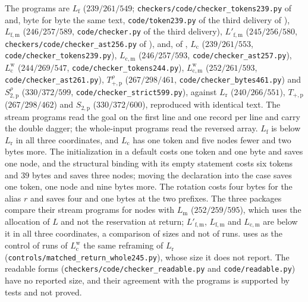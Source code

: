 The programs are $L_{\mathrm f}$ ($239/261/549$;
\texttt{checkers/code/checker\_tokens239.py} of 
and, byte for byte the same text, \texttt{code/token239.py} of the third delivery
of ), $L_{\mathrm{f,m}}$ ($246/257/589$,
\texttt{code/checker.py} of the third delivery), $L'_{\mathrm{f,m}}$
($245/256/580$, \texttt{checkers/code/checker\_ast256.py} of
), and, of ,
$L_{\mathrm c}$ ($239/261/553$, \texttt{code/checker\_tokens239.py}),
$L_{\mathrm{c,m}}$ ($246/257/593$, \texttt{code/checker\_ast257.py}),
$L^{\mathrm w}_{\mathrm c}$ ($244/269/547$, \texttt{code/checker\_tokens244.py}),
$L^{\mathrm w}_{\mathrm{c,m}}$ ($252/261/593$, \texttt{code/checker\_ast261.py}),
$T^{\rho}_{+,\mathrm p}$ ($267/298/461$, \texttt{code/checker\_bytes461.py}) and
$S^{\rho}_{2,\mathrm p}$ ($330/372/599$, \texttt{code/checker\_strict599.py}),
against $L_{\mathrm r}$ ($240/266/551$), $T_{+,\mathrm p}$ ($267/298/462$) and
$S_{2,\mathrm p}$ ($330/372/600$), reproduced with identical text. The stream
programs read the goal on the first line and one record per line and carry the
double dagger; the whole-input programs read the reversed array. $L_{\mathrm f}$ is
below $L_{\mathrm r}$ in all three coordinates, and $L_{\mathrm c}$ has one token
and five nodes fewer and two bytes more. The initialization in a default costs one
token and one byte and saves one node, and the structural binding with its empty
statement costs six tokens and $39$ bytes and saves three nodes; moving the
declaration into the case saves one token, one node and nine bytes more. The
rotation costs four bytes for the alias $r$ and saves four and one bytes at the two
prefixes. The three packages compare their stream programs for nodes with
$L_{\mathrm m}$ ($252/259/595$), which uses the allocation of $L$ and not the
reservation at return; $L'_{\mathrm{f,m}}$, $L_{\mathrm{f,m}}$ and
$L_{\mathrm{c,m}}$ are below it in all three coordinates, a comparison of sizes and
not of runs.  uses as the control of runs of
$L^{\mathrm w}_{\mathrm c}$ the same reframing of $L_{\mathrm r}$
(\texttt{controls/matched\_return\_whole245.py}), whose size it does not report.
The readable forms (\texttt{checkers/code/checker\_readable.py} and
\texttt{code/readable.py}) have no reported size, and their agreement with the
programs is supported by tests and not proved.

